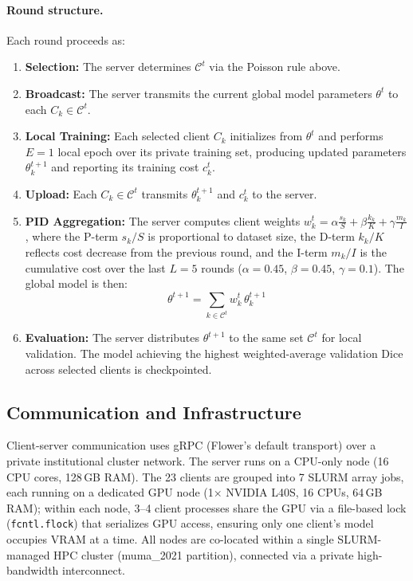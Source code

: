 \documentclass{article}
\begin{document}
\paragraph{Round structure.} Each round proceeds as:

\begin{enumerate}
    \item \textbf{Selection:} The server determines $\mathcal{C}^t$ via the Poisson rule above.
    \item \textbf{Broadcast:} The server transmits the current global model parameters $\theta^t$ to each $C_k \in \mathcal{C}^t$.
    \item \textbf{Local Training:} Each selected client $C_k$ initializes from $\theta^t$ and performs $E = 1$ local epoch over its private training set, producing updated parameters $\theta_k^{t+1}$ and reporting its training cost $c_k^t$.
    \item \textbf{Upload:} Each $C_k \in \mathcal{C}^t$ transmits $\theta_k^{t+1}$ and $c_k^t$ to the server.
    \item \textbf{PID Aggregation:} The server computes client weights $w_k^t = \alpha \frac{s_k}{S} + \beta \frac{k_k}{K} + \gamma \frac{m_k}{I}$, where the P-term $s_k/S$ is proportional to dataset size, the D-term $k_k/K$ reflects cost decrease from the previous round, and the I-term $m_k/I$ is the cumulative cost over the last $L=5$ rounds ($\alpha=0.45$, $\beta=0.45$, $\gamma=0.1$). The global model is then:
    \begin{equation}
        \theta^{t+1} = \sum_{k \in \mathcal{C}^t} w_k^t \, \theta_k^{t+1}
    \end{equation}
    \item \textbf{Evaluation:} The server distributes $\theta^{t+1}$ to the same set $\mathcal{C}^t$ for local validation. The model achieving the highest weighted-average validation Dice across selected clients is checkpointed.
\end{enumerate}

\subsection{Communication and Infrastructure}

Client-server communication uses gRPC (Flower's default transport) over a private institutional cluster network. The server runs on a CPU-only node (16 CPU cores, 128\,GB RAM). The 23 clients are grouped into 7 SLURM array jobs, each running on a dedicated GPU node (1$\times$ NVIDIA L40S, 16 CPUs, 64\,GB RAM); within each node, 3--4 client processes share the GPU via a file-based lock (\texttt{fcntl.flock}) that serializes GPU access, ensuring only one client's model occupies VRAM at a time. All nodes are co-located within a single SLURM-managed HPC cluster (muma\_2021 partition), connected via a private high-bandwidth interconnect.
\end{document}
